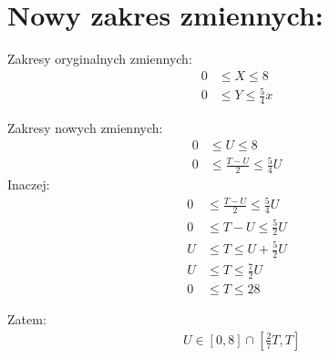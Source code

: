\documentclass[12pt]{article}
\begin{document}
\section*{Nowy zakres zmiennych:}

Zakresy oryginalnych zmiennych: \\
\begin{align*}
    0 &\leq X \leq 8 \\
    0 &\leq Y \leq \frac{5}{4}x
\end{align*}

Zakresy nowych zmiennych: \\
\begin{align*}
    0 &\leq U \leq 8 \\
    0 &\leq \frac{T - U}{2} \leq \frac{5}{4}U
\end{align*}
Inaczej:
\begin{align*}
    0 &\leq \frac{T - U}{2} \leq \frac{5}{4}U \\
    0 &\leq T - U \leq \frac{5}{2}U \\
    U &\leq T \leq U + \frac{5}{2}U \\
    U &\leq T \leq \frac{7}{2}U \\
    0 &\leq T \leq 28
\end{align*}

Zatem: 
\begin{align*}
    &U \in [0, 8]  \cap  [\frac{2}{7}T, T]\\
\end{align*}
\end{document}
